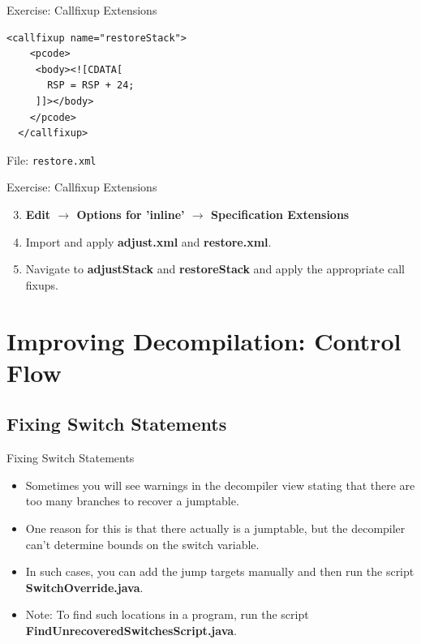 \documentclass{beamer}
\begin{document}
\begin{frame}[fragile]
\begin{block}{Exercise: Callfixup Extensions}
\begin{verbatim}
<callfixup name="restoreStack">
    <pcode>
     <body><![CDATA[
       RSP = RSP + 24;
     ]]></body>
    </pcode>
  </callfixup>
\end{verbatim}
File: \texttt{restore.xml}
\end{block}
\end{frame}

\begin{frame}
\begin{block}{Exercise: Callfixup Extensions}
\begin{enumerate}
\setcounter{enumi}{2}
\item \textbf{Edit $\rightarrow$ Options for 'inline' $\rightarrow$ Specification Extensions}
\item Import and apply \textbf{adjust.xml} and \textbf{restore.xml}.
\item Navigate to \textbf{adjustStack} and \textbf{restoreStack} and apply the appropriate call fixups.
\end{enumerate}
\end{block}
\end{frame}


\section{Improving Decompilation: Control Flow}

\subsection{Fixing Switch Statements}
\begin{frame}
\begin{block}{Fixing Switch Statements}
\begin{itemize}
\item Sometimes you will see warnings in the decompiler view stating that there are too many branches to recover a jumptable. 
\item One reason for this is that there actually is a jumptable, but the decompiler can't determine bounds on the switch variable.
\item In such cases, you can add the jump targets manually and then run the script \textbf{SwitchOverride.java}. 
\item Note: To find such locations in a program, run the script \textbf{FindUnrecoveredSwitchesScript.java}.
\end{itemize}
\end{block}
\end{frame}
\end{document}
